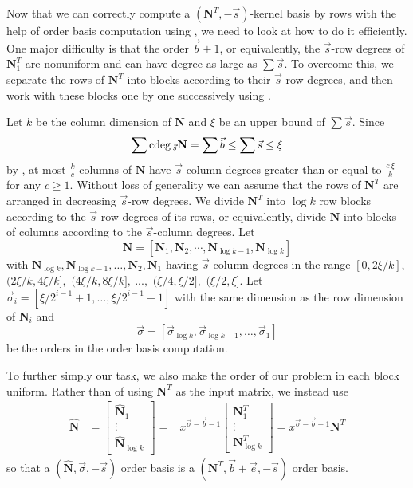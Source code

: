 Now that we can correctly compute a $\left(\mathbf{N}^{T},-\vec{s}\right)$-kernel
basis by rows with the help of order basis computation using ,
we need to look at how to do it efficiently. One major difficulty
is that the order $\vec{b}+1$, or equivalently, the $\vec{s}$-row
degrees of $\mathbf{N}_{1}^{T}$ are nonuniform and can have degree
as large as $\sum\vec{s}$. To overcome this, we separate the rows
of $\mathbf{N}^{T}$ into blocks according to their $\vec{s}$-row
degrees, and then work with these blocks one by one successively using
. 



Let $k$ be the column dimension of $\mathbf{N}$ and $\xi$ be an
upper bound of $\sum\vec{s}$. Since 
\[
\sum{\rm cdeg}\,_{\vec{s}}\mathbf{N}=\sum\vec{b}\le\sum\vec{s}\le\xi
\]
 by , at most
$\frac{k}{c}$ columns of $\mathbf{N}$ have $\vec{s}$-column degrees
greater than or equal to $\frac{c~\xi}{k}$ for any $c\ge1$. Without
loss of generality we can assume that the rows of $\mathbf{N}^{T}$
are arranged in decreasing $\vec{s}$-row degrees. We divide $\mathbf{N}^{T}$
into $\log k$ row blocks according to the $\vec{s}$-row degrees
of its rows, or equivalently, divide $\mathbf{N}$ into blocks of
columns according to the $\vec{s}$-column degrees. Let 
\[
\mathbf{N}=\left[\mathbf{N}_{1},\mathbf{N}_{2},\cdots,\mathbf{N}_{\log k-1},\mathbf{N}_{\log k}\right]
\]
with $\mathbf{N}_{\log k},\mathbf{N}_{\log k-1},\dots,\mathbf{N}_{2},\mathbf{N}_{1}$
having $\vec{s}$-column degrees in the range $\left[0,2\xi/k\right]$,
$(2\xi/k,4\xi/k],$ $(4\xi/k,8\xi/k],\ ...,$ $(\xi/4,\xi/2],$ $(\xi/2,\xi].$
Let $\vec{\sigma}_{i}=\left[\xi/2^{i-1}+1,\dots,\xi/2^{i-1}+1\right]$
with the same dimension as the row dimension of $\mathbf{N}_{i}$
and 
\[
\vec{\sigma}=\left[\vec{\sigma}_{\log k},\vec{\sigma}_{\log k-1},\dots,\vec{\sigma}_{1}\right]
\]
 be the orders in the order basis computation.

To further simply our task, we also make the order of our problem
in each block uniform. Rather than of using $\mathbf{N}^{T}$ as the
input matrix, we instead use 
\begin{eqnarray*}
\hat{\mathbf{N}} & =\begin{bmatrix}\hat{\mathbf{N}}_{1}\\
\vdots\\
\hat{\mathbf{N}}_{\log k}
\end{bmatrix}= & x^{\vec{\sigma}-\vec{b}-1}\begin{bmatrix}\mathbf{N}_{1}^{T}\\
\vdots\\
\mathbf{N}_{\log k}^{T}
\end{bmatrix}=x^{\vec{\sigma}-\vec{b}-1}\mathbf{N}^{T}
\end{eqnarray*}
so that a $\left(\hat{\mathbf{N}},\vec{\sigma},-\vec{s}\right)$ order
basis is a $\left(\mathbf{N}^{T},\vec{b}+\vec{e},-\vec{s}\right)$
order basis.

